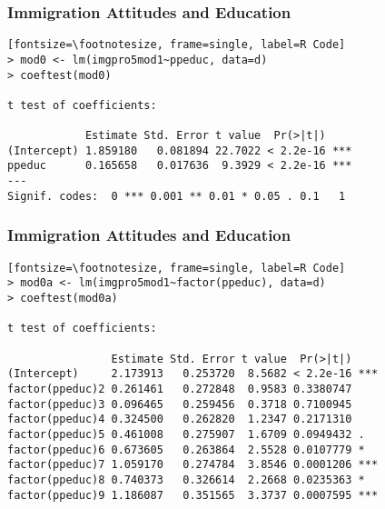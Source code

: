 \documentclass{beamer}
\numberwithin{equation}{section}
\begin{document}



\begin{frame}[fragile]
\frametitle{Immigration Attitudes and Education}

\begin{verbatim}[fontsize=\footnotesize, frame=single, label=R Code]
> mod0 <- lm(imgpro5mod1~ppeduc, data=d)
> coeftest(mod0)

t test of coefficients:

            Estimate Std. Error t value  Pr(>|t|)
(Intercept) 1.859180   0.081894 22.7022 < 2.2e-16 ***
ppeduc      0.165658   0.017636  9.3929 < 2.2e-16 ***
---
Signif. codes:  0 *** 0.001 ** 0.01 * 0.05 . 0.1   1
\end{verbatim}

\end{frame}

\begin{frame}[fragile]
\frametitle{Immigration Attitudes and Education}

\begin{verbatim}[fontsize=\footnotesize, frame=single, label=R Code]
> mod0a <- lm(imgpro5mod1~factor(ppeduc), data=d)
> coeftest(mod0a)

t test of coefficients:

                Estimate Std. Error t value  Pr(>|t|)
(Intercept)     2.173913   0.253720  8.5682 < 2.2e-16 ***
factor(ppeduc)2 0.261461   0.272848  0.9583 0.3380747
factor(ppeduc)3 0.096465   0.259456  0.3718 0.7100945
factor(ppeduc)4 0.324500   0.262820  1.2347 0.2171310
factor(ppeduc)5 0.461008   0.275907  1.6709 0.0949432 .
factor(ppeduc)6 0.673605   0.263864  2.5528 0.0107779 *
factor(ppeduc)7 1.059170   0.274784  3.8546 0.0001206 ***
factor(ppeduc)8 0.740373   0.326614  2.2668 0.0235363 *
factor(ppeduc)9 1.186087   0.351565  3.3737 0.0007595 ***
\end{verbatim}

\end{frame}
\end{document}
